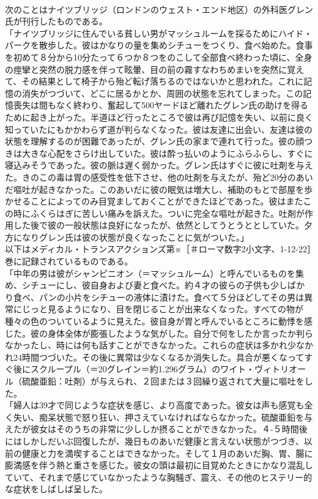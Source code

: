 \documentclass[8pt]{extreport}
\begin{document}
\begin{CJK}{UTF8}{min}
\\	次のことはナイツブリッジ（ロンドンのウェスト・エンド地区）の外科医グレン氏が刊行したものである。
\\	「ナイツブリッジに住んでいる貧しい男がマッシュルームを採るためにハイド・パークを散歩した。彼はかなりの量を集めシチューをつくり、食べ始めた。食事を初めて８分から10分たって６つか８つをのこして全部食べ終わった頃に、全身の痙攣と突然の脱力感を伴って眩暈、目の前の霧すなわちめまいを突然に覚えて、その結果として椅子から殆ど転げ落ちるのではないかと思われた。これに記憶の消失がつづいて、どこに居るかとか、周囲の状態を忘れてしまった。この記憶喪失は間もなく終わり、奮起して500ヤードほど離れたグレン氏の助けを得るために起き上がった。半道ほど行ったところで彼は再び記憶を失い、以前に良く知っていたにもかかわらず道が判らなくなった。彼は友達に出会い、友達は彼の状態を理解するのが困難であったが、グレン氏の家まで連れて行った。彼の顔つきは大きな心配をさらけ出していた。彼は酔っ払いのようにふらふらし、すぐに寝込みそうであった。彼の脈は遅く弱かった。グレン氏はすぐに彼に吐剤を与えた。きのこの毒は胃の感受性を低下させ、他の吐剤を与えたが、殆ど20分のあいだ嘔吐が起きなかった。このあいだに彼の眠気は増大し、補助のもとで部屋を歩かせることによってのみ目覚ましておくことができたほどであった。彼はまたこの時にふくらはぎに苦しい痛みを訴えた。ついに完全な嘔吐が起きた。吐剤が作用した後で彼の一般状態は良好になったが、依然としてうとうととしていた。夕方になりグレン氏は彼の状態が良くなったことに気がついた。」
\\	以下はメディカル・トランスアクションズ第※［＃ローマ数字2小文字、1-12-22］巻に記録されているものである。
\\	「中年の男は彼がシャンピニオン（＝マッシュルーム）と呼んでいるものを集め、シチューにし、彼自身および妻と食べた。約４才の彼らの子供も少しばかり食べ、パンの小片をシチューの液体に漬けた。食べて５分ほどしてその男は異常にじっと見るようになり、目を閉じることが出来なくなった。すべての物が種々の色のついているように見えた。彼自身が胃と呼んでいるところに動悸を感じた。彼の身体全体が膨張したような気がした。自分で何をしたか言ったか判らなかったし、時には何も話すことができなかった。これらの症状は多かれ少なかれ24時間つづいた。その後に異常は少なくなるか消失した。具合が悪くなってすぐ後にスクループル（＝20グレイン＝約1.296グラム）のワイト・ヴィトリオール（硫酸亜鉛：吐剤）が与えられ、２回または３回繰り返されて大量に嘔吐をした。
\\	「婦人は39才で同じような症状を感じ、より高度であった。彼女は声も感覚も全く失い、痴呆状態で怒り狂い、押さえていなければならなかった。硫酸亜鉛を与えたが彼女はそのうちの非常に少ししか摂ることができなかった。４-５時間後にはしかしだいぶ回復したが、幾日ものあいだ健康と言えない状態がつづき、以前の健康と力を満喫することはできなかった。そして１月のあいだ胸、胃、腸に膨満感を伴う熱と重さを感じた。彼女の頭は最初に目覚めたときにかなり混乱していて、それまで感じていなかったような胸騒ぎ、震え、その他のヒステリー的な症状をしばしば呈した。

\end{CJK}
\end{document}
